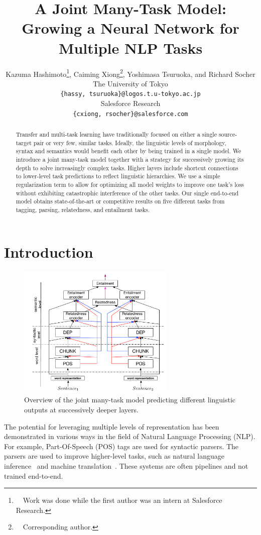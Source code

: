 \documentclass[11pt,a4paper]{article}
\title{A Joint Many-Task Model:\\Growing a Neural Network for Multiple NLP Tasks}
\author{Kazuma Hashimoto\thanks{~~Work was done while the first author was an intern at Salesforce Research.}, Caiming Xiong\thanks{~~Corresponding author.}, Yoshimasa Tsuruoka, and Richard Socher  \\
The University of Tokyo \\
\texttt{\{hassy, tsuruoka\}@logos.t.u-tokyo.ac.jp} \\
Salesforce Research \\
\texttt{\{cxiong, rsocher\}@salesforce.com} \\
}
\begin{document}
\maketitle

\begin{abstract}
Transfer and multi-task learning have traditionally focused on either a single source-target pair or very few, similar tasks.
Ideally, the linguistic levels of morphology, syntax and semantics would benefit each other by being trained in a single model.
We introduce a joint many-task model together with a strategy for successively growing its depth to solve increasingly complex tasks.
Higher layers include shortcut connections to lower-level task predictions to reflect linguistic hierarchies.
We use a simple regularization term to allow for optimizing all model weights to improve one task's loss without exhibiting catastrophic interference of the other tasks.
Our single end-to-end model obtains state-of-the-art or competitive results on five different tasks from tagging, parsing, relatedness, and entailment tasks.
\end{abstract}


\section{Introduction}

\begin{figure}[t]
	\begin{center}
    	\includegraphics[width=75mm]{framework.pdf}
    \end{center}
\label{fig1}

\caption{Overview of the joint many-task model predicting different linguistic outputs at successively deeper layers.}
\end{figure}

The potential for leveraging multiple levels of representation has been demonstrated in various ways in the field of Natural Language Processing (NLP).
For example, Part-Of-Speech (POS) tags are used for syntactic parsers.
The parsers are used to improve higher-level tasks, such as natural language inference~\citep{chen2016snli} and machine translation~\citep{eriguchi2016}.
These systems are often pipelines and not trained end-to-end.
\end{document}
